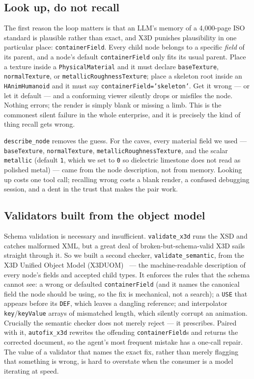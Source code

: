 \documentclass[11pt]{article}
\begin{document}
\subsection{Look up, do not recall}

The first reason the loop matters is that an LLM's memory of a 4,000-page ISO standard is plausible rather than exact, and X3D punishes plausibility in one particular place: \texttt{containerField}. Every child node belongs to a specific \emph{field} of its parent, and a node's default \texttt{containerField} only fits its usual parent. Place a texture inside a \texttt{PhysicalMaterial} and it must declare \texttt{baseTexture}, \texttt{normalTexture}, or \texttt{metallicRoughnessTexture}; place a skeleton root inside an \texttt{HAnimHumanoid} and it must say \texttt{containerField='skeleton'}. Get it wrong --- or let it default --- and a conforming viewer silently drops or misfiles the node. Nothing errors; the render is simply blank or missing a limb. This is the commonest silent failure in the whole enterprise, and it is precisely the kind of thing recall gets wrong.

\texttt{describe\_node} removes the guess. For the caves, every material field we used --- \texttt{baseTexture}, \texttt{normalTexture}, \texttt{metallicRoughnessTexture}, and the scalar \texttt{metallic} (default \texttt{1}, which we set to \texttt{0} so dielectric limestone does not read as polished metal) --- came from the node description, not from memory. Looking up costs one tool call; recalling wrong costs a blank render, a confused debugging session, and a dent in the trust that makes the pair work.

\subsection{Validators built from the object model}

Schema validation is necessary and insufficient. \texttt{validate\_x3d} runs the XSD and catches malformed XML, but a great deal of broken-but-schema-valid X3D sails straight through it. So we built a second checker, \texttt{validate\_semantic}, from the X3D Unified Object Model (X3DUOM)~\cite{x3duom} --- the machine-readable description of every node's fields and accepted child types. It enforces the rules that the schema cannot see: a wrong or defaulted \texttt{containerField} (and it names the canonical field the node should be using, so the fix is mechanical, not a search); a \texttt{USE} that appears before its \texttt{DEF}, which leaves a dangling reference; and interpolator \texttt{key}/\texttt{keyValue} arrays of mismatched length, which silently corrupt an animation. Crucially the semantic checker does not merely reject --- it prescribes. Paired with it, \texttt{autofix\_x3d} rewrites the offending \texttt{containerField}s and returns the corrected document, so the agent's most frequent mistake has a one-call repair. The value of a validator that names the exact fix, rather than merely flagging that something is wrong, is hard to overstate when the consumer is a model iterating at speed.
\end{document}
